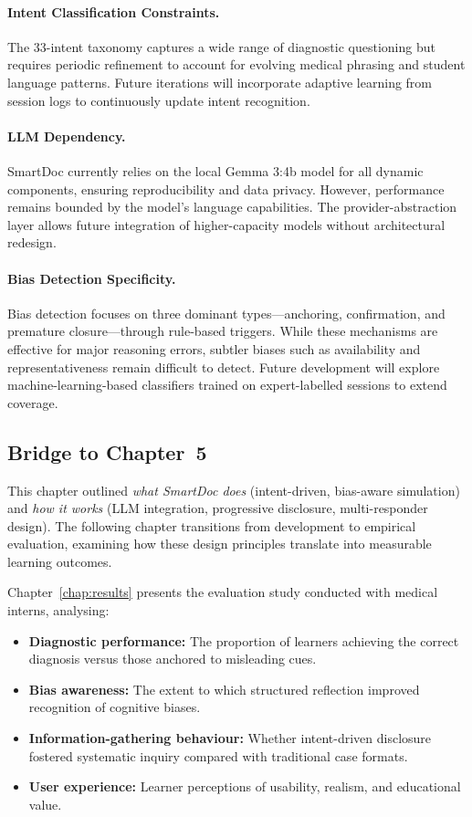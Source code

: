\paragraph{Intent Classification Constraints.}
The 33-intent taxonomy captures a wide range of diagnostic questioning but requires periodic refinement to account for evolving medical phrasing and student language patterns. Future iterations will incorporate adaptive learning from session logs to continuously update intent recognition.

\paragraph{LLM Dependency.}
SmartDoc currently relies on the local Gemma 3:4b model for all dynamic components, ensuring reproducibility and data privacy. However, performance remains bounded by the model’s language capabilities. The provider-abstraction layer allows future integration of higher-capacity models without architectural redesign.

\paragraph{Bias Detection Specificity.}
Bias detection focuses on three dominant types—anchoring, confirmation, and premature closure—through rule-based triggers. While these mechanisms are effective for major reasoning errors, subtler biases such as availability and representativeness remain difficult to detect. Future development will explore machine-learning-based classifiers trained on expert-labelled sessions to extend coverage.

\subsection{Bridge to Chapter~5}
This chapter outlined \emph{what SmartDoc does} (intent-driven, bias-aware simulation) and \emph{how it works} (LLM integration, progressive disclosure, multi-responder design). The following chapter transitions from development to empirical evaluation, examining how these design principles translate into measurable learning outcomes.

Chapter~\ref{chap:results} presents the evaluation study conducted with medical interns, analysing:
\begin{itemize}
    \item \textbf{Diagnostic performance:} The proportion of learners achieving the correct diagnosis versus those anchored to misleading cues.
    \item \textbf{Bias awareness:} The extent to which structured reflection improved recognition of cognitive biases.
    \item \textbf{Information-gathering behaviour:} Whether intent-driven disclosure fostered systematic inquiry compared with traditional case formats.
    \item \textbf{User experience:} Learner perceptions of usability, realism, and educational value.
\end{itemize}

